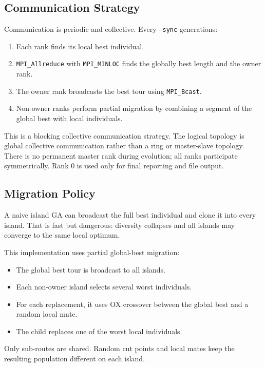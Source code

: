 \documentclass[11pt,a4paper]{article}
\begin{document}
\subsection{Communication Strategy}
Communication is periodic and collective. Every \texttt{--sync} generations:

\begin{enumerate}[leftmargin=*]
  \item Each rank finds its local best individual.
  \item \texttt{MPI\_Allreduce} with \texttt{MPI\_MINLOC} finds the globally best
  length and the owner rank.
  \item The owner rank broadcasts the best tour using \texttt{MPI\_Bcast}.
  \item Non-owner ranks perform partial migration by combining a segment of the
  global best with local individuals.
\end{enumerate}

This is a blocking collective communication strategy. The logical topology is
global collective communication rather than a ring or master-slave topology.
There is no permanent master rank during evolution; all ranks participate
symmetrically. Rank 0 is used only for final reporting and file output.

\subsection{Migration Policy}
A naive island GA can broadcast the full best individual and clone it into every
island. That is fast but dangerous: diversity collapses and all islands may
converge to the same local optimum.

This implementation uses partial global-best migration:

\begin{itemize}[leftmargin=*]
  \item The global best tour is broadcast to all islands.
  \item Each non-owner island selects several worst individuals.
  \item For each replacement, it uses OX crossover between the global best and a
  random local mate.
  \item The child replaces one of the worst local individuals.
\end{itemize}

Only sub-routes are shared. Random cut points and local mates keep the resulting
population different on each island.
\end{document}
